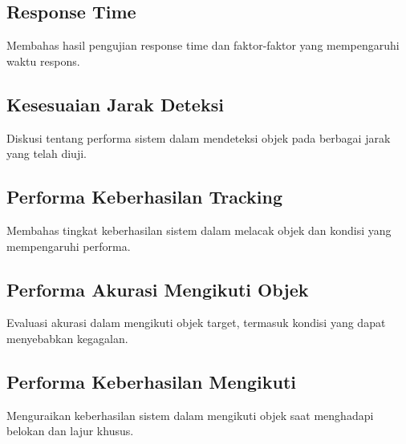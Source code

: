 \subsection{Response Time}
\label{sec:responsetime}

Membahas hasil pengujian response time dan faktor-faktor yang mempengaruhi waktu respons.

\subsection{Kesesuaian Jarak Deteksi}
\label{sec:kesesuaianjarak}

Diskusi tentang performa sistem dalam mendeteksi objek pada berbagai jarak yang telah diuji.

\subsection{Performa Keberhasilan Tracking}
\label{sec:performatracking}

Membahas tingkat keberhasilan sistem dalam melacak objek dan kondisi yang mempengaruhi performa.

\subsection{Performa Akurasi Mengikuti Objek}
\label{sec:akurasiikutiobjek}

Evaluasi akurasi dalam mengikuti objek target, termasuk kondisi yang dapat menyebabkan kegagalan.

\subsection{Performa Keberhasilan Mengikuti}
\label{sec:keberhasilanmengikuti}

Menguraikan keberhasilan sistem dalam mengikuti objek saat menghadapi belokan dan lajur khusus.